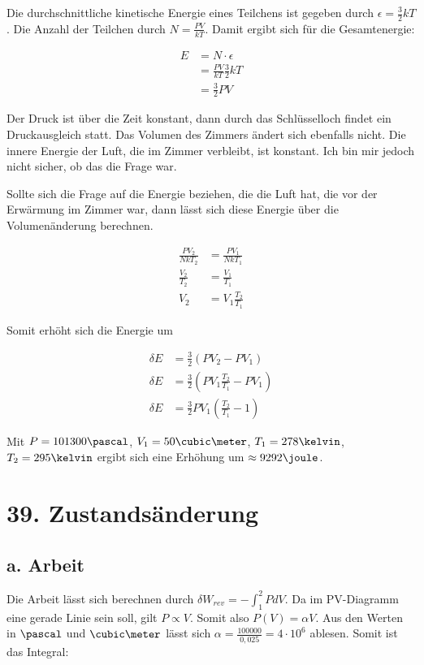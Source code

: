 \documentclass[a4paper,german,12pt,smallheadings]{scrartcl}
\begin{document}
Die durchschnittliche kinetische Energie eines Teilchens ist gegeben durch
$\epsilon = \frac{3}{2} kT$. Die Anzahl der Teilchen durch $N = \frac{PV}{kT}$.
Damit ergibt sich für die Gesamtenergie:

\begin{align*}
  E &= N \cdot \epsilon \\
    &= \frac{PV}{kT} \frac{3}{2} kT \\
    &= \frac{3}{2} PV
\end{align*}

Der Druck ist über die Zeit konstant, dann durch das Schlüsselloch findet ein
Druckausgleich statt. Das Volumen des Zimmers ändert sich ebenfalls nicht. Die
innere Energie der Luft, die im Zimmer verbleibt, ist konstant. Ich bin mir
jedoch nicht sicher, ob das die Frage war.

Sollte sich die Frage auf die Energie beziehen, die die Luft hat, die vor der
Erwärmung im Zimmer war, dann lässt sich diese Energie über die Volumenänderung
berechnen.

\begin{align*}
  \frac{PV_2}{NkT_2} &= \frac{PV_1}{NkT_1} \\
  \frac{V_2}{T_2} &= \frac{V_1}{T_1} \\
  V_2 &= V_1 \frac{T_2}{T_1}
\end{align*}

Somit erhöht sich die Energie um

\begin{align*}
  \delta E &= \frac{3}{2} (PV_2 - PV_1) \\
  \delta E &= \frac{3}{2} \left(PV_1 \frac{T_2}{T_1} - PV_1\right) \\
  \delta E &= \frac{3}{2} PV_1 \left(\frac{T_2}{T_1} - 1\right)
\end{align*}

Mit $P = 101300 \pascal$, $V_1 = 50 \cubic\meter$, $T_1 = 278 \kelvin$, $T_2 =
295 \kelvin$ ergibt sich eine Erhöhung um $\approx 9292 \joule$.

\section*{39. Zustandsänderung}
\subsection*{a. Arbeit}

Die Arbeit lässt sich berechnen durch $\delta W_{rev} = -\int_1^2 PdV$. Da im
PV-Diagramm eine gerade Linie sein soll, gilt $P \propto V$. Somit also $P(V) =
\alpha V$. Aus den Werten in $\pascal$ und $\cubic\meter$ lässt sich $\alpha = \frac{100000}{0{,}025} = 4\cdot 10^6$ ablesen. Somit ist
das Integral:
\end{document}
